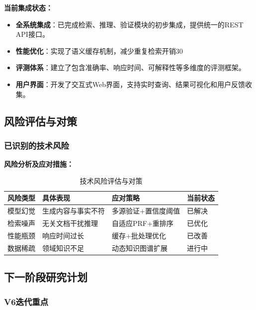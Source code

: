 \textbf{当前集成状态：}

\begin{itemize}
    \item \textbf{全系统集成}：已完成检索、推理、验证模块的初步集成，提供统一的REST API接口。
    
    \item \textbf{性能优化}：实现了语义缓存机制，减少重复检索开销30%
    
    \item \textbf{评测体系}：建立了包含准确率、响应时间、可解释性等多维度的评测框架。
    
    \item \textbf{用户界面}：开发了交互式Web界面，支持实时查询、结果可视化和用户反馈收集。
\end{itemize}

\subsection{风险评估与对策}

\subsubsection{已识别的技术风险}

\textbf{风险分析及应对措施：}

\begin{table}[H]
\centering
\caption{技术风险评估与对策}
\begin{tabular}{|l|p{4cm}|p{4cm}|p{2cm}|}
\hline
\textbf{风险类型} & \textbf{具体表现} & \textbf{应对策略} & \textbf{当前状态} \\
\hline
模型幻觉 & 生成内容与事实不符 & 多源验证+置信度阈值 & 已解决 \\
\hline
检索噪声 & 无关文档干扰推理 & 自适应PRF+重排序 & 已优化 \\
\hline
性能瓶颈 & 响应时间过长 & 缓存+批处理优化 & 已改善 \\
\hline
数据稀疏 & 领域知识不足 & 动态知识图谱扩展 & 进行中 \\
\hline
\end{tabular}
\end{table}

\subsection{下一阶段研究计划}

\subsubsection{V6迭代重点}

